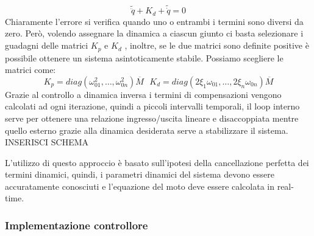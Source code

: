 \begin{equation}
\tilde{\ddot{q}} + K_d + \tilde{\dot{q}} = 0
\end{equation}
Chiaramente l'errore si verifica quando uno o entrambi i termini sono diversi da zero.  Però, volendo assegnare la dinamica a ciascun giunto ci basta selezionare  i guadagni delle matrici $K_p$ e $K_d$ , inoltre, se le due matrici sono definite positive è possibile ottenere un sistema asintoticamente stabile. 
Possiamo scegliere le matrici come:
\begin{equation*}
K_p = diag(\omega^2_{01}, \dots, \omega^2_{0n}) \overline{M} \ \ \  K_d = diag(2 \xi_1 \omega_{01}, \dots ,2 \xi_n \omega_{0n}) \overline{M} 
\end{equation*}
Grazie al controllo a dinamica inversa i termini di compensazioni vengono calcolati ad ogni iterazione, quindi a piccoli intervalli temporali, il loop interno serve per ottenere una relazione ingresso/uscita lineare e disaccoppiata mentre quello esterno grazie alla dinamica desiderata serve a stabilizzare il sistema.
INSERISCI SCHEMA
\par L'utilizzo di questo approccio è basato sull'ipotesi della cancellazione perfetta dei termini dinamici, quindi, i parametri dinamici del sistema devono essere accuratamente conosciuti e l'equazione del moto deve essere calcolata in real-time.
\subsubsection*{Implementazione controllore}
